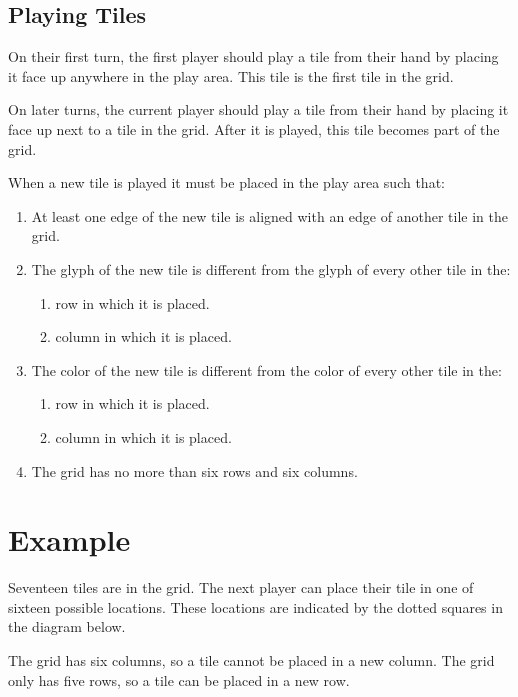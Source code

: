 \documentclass[a4paper, 10pt, notumble]{leaflet}
\begin{document}
\subsection{Playing Tiles}
On their first turn, the first player should play a tile from their hand by placing it face up anywhere in the play area. This tile is the first tile in the grid.

On later turns, the current player should play a tile from their hand by placing it face up next to a tile in the grid. After it is played, this tile becomes part of the grid.

When a new tile is played it must be placed in the play area such that:
\begin{enumerate}
  \item At least one edge of the new tile is aligned with an edge of another tile in the grid.
  \item The glyph of the new tile is different from the glyph of every other tile in the:
  \begin{enumerate}
  	\item row in which it is placed.
    	\item column in which it is placed.
  \end{enumerate}
  \item The color of the new tile is different from the color of every other tile in the:
  \begin{enumerate}
  	\item row in which it is placed.
    \item column in which it is placed.
  \end{enumerate}
  \item The grid has no more than six rows and six columns.
\end{enumerate}

\newpage

\section{Example}
Seventeen tiles are in the grid. The next player can place their tile in one of sixteen possible locations. These locations are indicated by the dotted squares in the diagram below.

The grid has six columns, so a tile cannot be placed in a new column. The grid only has five rows, so a tile can be placed in a new row.
\end{document}
